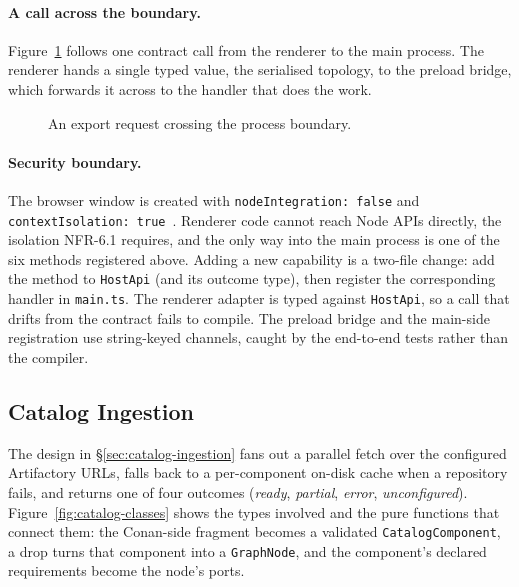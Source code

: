 \paragraph{A call across the boundary.}
Figure~\ref{fig:export-sequence} follows one contract call from the renderer to the main process. The renderer hands a single typed value, the serialised topology, to the preload bridge, which forwards it across to the handler that does the work.
\begin{figure}[H]
    \centering
    \resizebox{\textwidth}{!}{
        
    }
    \caption[An export request crossing the process boundary.]{An export request crossing the process boundary.}
    \label{fig:export-sequence}
\end{figure}

\paragraph{Security boundary.}
The browser window is created with \texttt{nodeIntegration: false} and \texttt{contextIsolation: true}~\cite{electronjs}. Renderer code cannot reach Node APIs directly, the isolation NFR-6.1 requires, and the only way into the main process is one of the six methods registered above. Adding a new capability is a two-file change: add the method to \texttt{HostApi} (and its outcome type), then register the corresponding handler in \texttt{main.ts}. The renderer adapter is typed against \texttt{HostApi}, so a call that drifts from the contract fails to compile. The preload bridge and the main-side registration use string-keyed channels, caught by the end-to-end tests rather than the compiler.

\FloatBarrier

\subsection{Catalog Ingestion}
\label{sec:catalog-impl}

The design in \S\ref{sec:catalog-ingestion} fans out a parallel fetch over the configured Artifactory URLs, falls back to a per-component on-disk cache when a repository fails, and returns one of four outcomes (\textit{ready}, \textit{partial}, \textit{error}, \textit{unconfigured}). Figure~\ref{fig:catalog-classes} shows the types involved and the pure functions that connect them: the Conan-side fragment becomes a validated \texttt{CatalogComponent}, a drop turns that component into a \texttt{GraphNode}, and the component's declared requirements become the node's ports.

